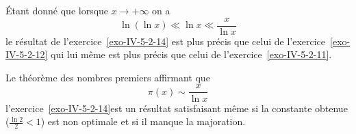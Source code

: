 \begin{sol}
Étant donné que lorsque $x \to + \infty$ on a
$$\ln(\ln x) \ll \ln x \ll \frac{x}{\ln x}$$
le résultat de l'exercice~\ref{exo-IV-5-2-14} est plus précis que celui de l'exercice~\ref{exo-IV-5-2-12} qui lui même est plus précis que celui de l'exercice~\ref{exo-IV-5-2-11}.

Le théorème des nombres premiers affirmant que
$$\pi(x) \sim \frac{x}{\ln x}$$
l'exercice~\ref{exo-IV-5-2-14}est un résultat satisfaisant même si la constante obtenue ($\frac{\ln 2}{2}< 1$) est non optimale et si il manque la majoration.
\end{sol}